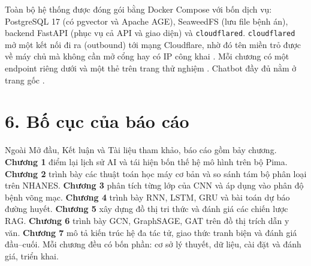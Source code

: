 Toàn bộ hệ thống được đóng gói bằng Docker Compose với bốn dịch vụ: PostgreSQL 17 (có pgvector và Apache AGE), SeaweedFS (lưu file bệnh án), backend FastAPI (phục vụ cả API và giao diện) và \texttt{cloudflared}. \texttt{cloudflared} mở một kết nối đi ra (outbound) tới mạng Cloudflare, nhờ đó tên miền \texttt{\deploydomain} trỏ được về máy chủ mà không cần mở cổng hay có IP công khai \cite{cloudflaretunnel}. Mỗi chương có một endpoint riêng dưới  và một thẻ trên trang thử nghiệm . Chatbot đầy đủ nằm ở trang gốc \api{/}.

\section*{6. Bố cục của báo cáo}

Ngoài Mở đầu, Kết luận và Tài liệu tham khảo, báo cáo gồm bảy chương. \textbf{Chương 1} điểm lại lịch sử AI và tái hiện bốn thế hệ mô hình trên bộ Pima. \textbf{Chương 2} trình bày các thuật toán học máy cơ bản và so sánh tám bộ phân loại trên NHANES. \textbf{Chương 3} phân tích từng lớp của CNN và áp dụng vào phân độ bệnh võng mạc. \textbf{Chương 4} trình bày RNN, LSTM, GRU và bài toán dự báo đường huyết. \textbf{Chương 5} xây dựng đồ thị tri thức và đánh giá các chiến lược RAG. \textbf{Chương 6} trình bày GCN, GraphSAGE, GAT trên đồ thị trích dẫn y văn. \textbf{Chương 7} mô tả kiến trúc hệ đa tác tử, giao thức tranh biện và đánh giá đầu–cuối. Mỗi chương đều có bốn phần: cơ sở lý thuyết, dữ liệu, cài đặt và đánh giá, triển khai.
